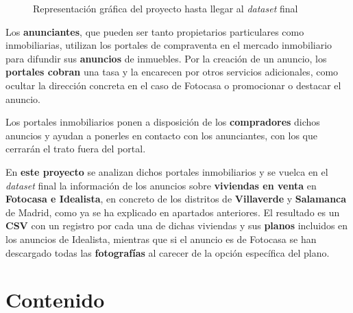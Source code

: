 \documentclass[12pt]{article}
\begin{document}
\begin{figure}[h]
	\centering
	\caption{Representación gráfica del proyecto hasta llegar al \textit{dataset} final}
\end{figure}

Los \textbf{anunciantes}, que pueden ser tanto propietarios particulares como inmobiliarias, utilizan los portales de compraventa en el mercado inmobiliario para difundir sus \textbf{anuncios} de inmuebles. Por la creación de un anuncio, los \textbf{portales cobran} una tasa y la encarecen por otros servicios adicionales, como ocultar la dirección concreta en el caso de Fotocasa o promocionar o destacar el anuncio.

Los portales inmobiliarios ponen a disposición de los \textbf{compradores} dichos anuncios y ayudan a ponerles en contacto con los anunciantes, con los que cerrarán el trato fuera del portal.

En \textbf{este proyecto} se analizan dichos portales inmobiliarios y se vuelca en el \textit{dataset} final la información de los anuncios sobre \textbf{viviendas en venta} en \textbf{Fotocasa e Idealista}, en concreto de los distritos de \textbf{Villaverde} y \textbf{Salamanca} de Madrid, como ya se ha explicado en apartados anteriores. El resultado es un \textbf{CSV} con un registro por cada una de dichas viviendas y sus \textbf{planos} incluidos en los anuncios de Idealista, mientras que si el anuncio es de Fotocasa se han descargado todas las \textbf{fotografías} al carecer de la opción específica del plano. 

\vspace{-1.5em}\section{Contenido}\vspace{-1.0em}
\end{document}
